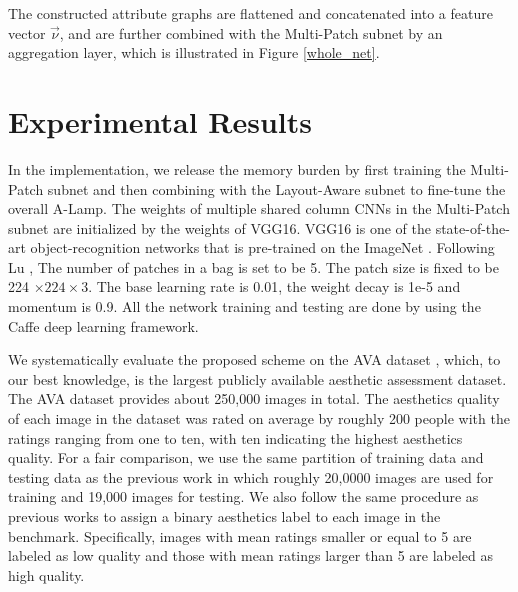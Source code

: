 \documentclass[10pt,twocolumn,letterpaper]{article}
\begin{document}
The constructed attribute graphs are flattened and concatenated into a feature vector ${\vec \nu }$, and are further combined with the Multi-Patch subnet by an aggregation layer, which is illustrated in Figure \ref{whole_net}.


\section{Experimental Results} \label{experiments}
In the implementation, we release the memory burden by first training the Multi-Patch subnet and then combining with the Layout-Aware subnet to fine-tune the overall A-Lamp. The weights of multiple shared column CNNs in the Multi-Patch subnet are initialized by the weights of VGG16. VGG16 is one of the state-of-the-art object-recognition networks that is pre-trained on the ImageNet \cite{Alex:2012:NIPS:ImageNet}.  
Following Lu \cite{Lu:2015:ICCV}, The number of patches in a bag is set to be 5. The patch size is fixed to be 224 $ \times 224 \times 3$. The base learning rate is 0.01, the weight decay is 1e-5 and momentum is 0.9.  
All the network training and testing are done by using the Caffe deep learning framework\cite{Jia:2014:ACMMM:caffe}. 

We systematically evaluate the proposed scheme on the AVA dataset \cite{Murray:MMP2012:AVA}, which, to our best knowledge, is the largest publicly available aesthetic assessment dataset. The AVA dataset provides about 250,000 images in total. The aesthetics quality of each image in the dataset was rated on average by roughly 200 people with the ratings ranging from one to ten, with ten indicating the highest aesthetics quality. For a fair comparison, we use the same partition of training data and testing data as the previous
work \cite{Lu:2014:ACMMM,Lu:2015:ICCV,Mai:2016:CVPR,Murray:MMP2012:AVA} in which roughly 20,0000 images are used for training and 19,000 images for testing. We also follow the same procedure as previous works to assign a binary aesthetics label to each image in the benchmark. Specifically, images with mean ratings smaller or equal to 5 are labeled as low quality and those with mean ratings larger than 5 are labeled as high quality.
\end{document}
